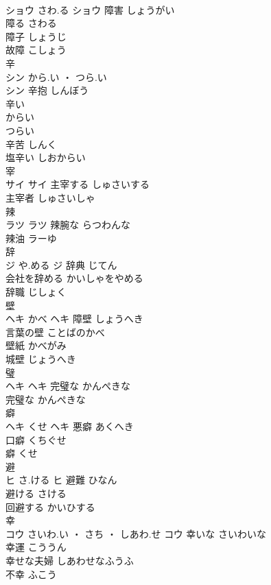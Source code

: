 \documentclass[8pt]{extreport}
\begin{document}
\begin{CJK}{UTF8}{min}
\\	ショウ	さわ.る	ショウ	障害	しょうがい	
\\	障る	さわる	
\\	障子	しょうじ	
\\	故障	こしょう	
\\	辛	
\\	シン	から.い ・ つら.い
\\	シン	辛抱	しんぼう	
\\	辛い 
\\	からい 
\\	つらい	
\\	辛苦	しんく	
\\	塩辛い	しおからい	
\\	宰	
\\	サイ		サイ	主宰する	しゅさいする	
\\	主宰者	しゅさいしゃ	
\\	辣	
\\	ラツ		ラツ	辣腕な	らつわんな	
\\	辣油	ラーゆ	
\\	辞	
\\	ジ	や.める	ジ	辞典	じてん	
\\	会社を辞める	かいしゃをやめる	
\\	辞職	じしょく	
\\	壁	
\\	ヘキ	かべ	ヘキ	障壁	しょうへき	
\\	言葉の壁	ことばのかべ	
\\	壁紙	かべがみ	
\\	城壁	じょうへき	
\\	璧	
\\	ヘキ		ヘキ	完璧な	かんぺきな	
\\	完璧な	かんぺきな	
\\	癖	
\\	ヘキ	くせ	ヘキ	悪癖	あくへき	
\\	口癖	くちぐせ	
\\	癖	くせ	
\\	避	
\\	ヒ	さ.ける	ヒ	避難	ひなん	
\\	避ける	さける	
\\	回避する	かいひする	
\\	幸	
\\	コウ	さいわ.い ・ さち ・ しあわ.せ	コウ	幸いな	さいわいな	
\\	幸運	こううん	
\\	幸せな夫婦	しあわせなふうふ	
\\	不幸	ふこう	

\end{CJK}
\end{document}
